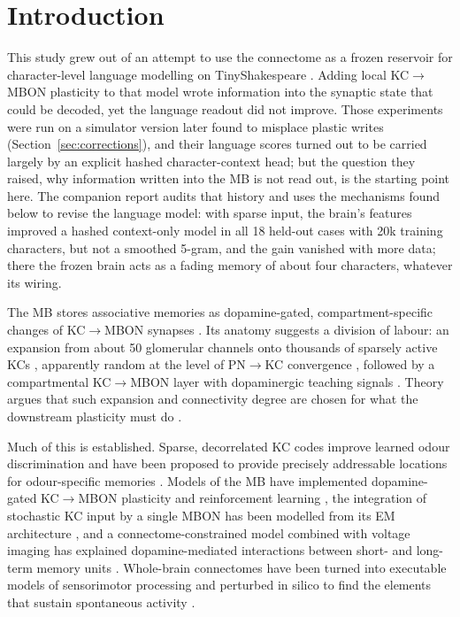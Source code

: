 \documentclass[conference]{IEEEtran}
\begin{document}
\section{Introduction}
This study grew out of an attempt to use the connectome as a frozen reservoir
for character-level language modelling on TinyShakespeare \cite{lmcompanion}.
Adding local KC$\rightarrow$MBON plasticity to that model wrote information
into the synaptic state that could be decoded, yet the language readout did
not improve. Those experiments were run on a simulator version later found to
misplace plastic writes (Section~\ref{sec:corrections}), and their language
scores turned out to be carried largely by an explicit hashed character-context
head; but the question they raised, why information written into the MB is
not read out, is the starting point here. The companion report
\cite{lmcompanion} audits that history and uses the mechanisms found below to
revise the language model: with sparse input, the brain's features improved a
hashed context-only model in all 18 held-out cases with 20k training
characters, but not a smoothed 5-gram, and the gain vanished with more data;
there the frozen brain acts as a fading memory of about four characters,
whatever its wiring.

The MB stores associative memories as dopamine-gated, compartment-specific
changes of KC$\rightarrow$MBON synapses \cite{hige2015,aso2014a,modi2020}.
Its anatomy suggests a division of labour: an expansion from about 50
glomerular channels onto thousands of sparsely active KCs
\cite{honegger2011,lin2014}, apparently random at the level of
PN$\rightarrow$KC convergence \cite{caron2013}, followed by a compartmental
KC$\rightarrow$MBON layer with dopaminergic teaching signals
\cite{aso2014a,takemura2017,li2020}. Theory argues that such expansion and
connectivity degree are chosen for what the downstream plasticity must do
\cite{litwinkumar2017}.

Much of this is established. Sparse, decorrelated KC codes improve learned
odour discrimination and have been proposed to provide precisely addressable
locations for odour-specific memories \cite{lin2014}. Models of the MB have
implemented dopamine-gated KC$\rightarrow$MBON plasticity and reinforcement
learning \cite{bennett2021}, the integration of stochastic KC input by a
single MBON has been modelled from its EM architecture \cite{hafez2023}, and a
connectome-constrained model combined with voltage imaging has explained
dopamine-mediated interactions between short- and long-term memory units
\cite{huang2024}. Whole-brain connectomes have been turned into executable
models of sensorimotor processing \cite{shiu2024,lappalainen2024} and perturbed
in silico to find the elements that sustain spontaneous activity
\cite{li2026}.
\end{document}
